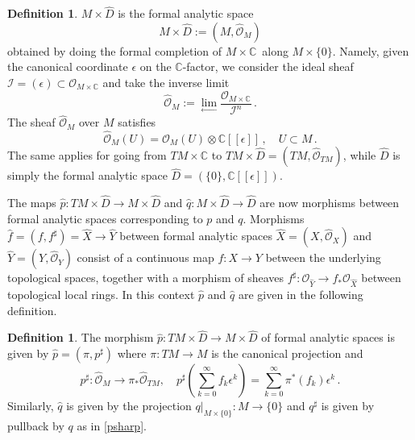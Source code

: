 \documentclass{article}
\theoremstyle{definition}
\newtheorem{definition}[theorem]{Definition}
\numberwithin{equation}{section}
\begin{document}
\begin{definition} $M\times \widehat{D}$ is the formal analytic space \begin{equation*}M\times \widehat{D}:=(M,\widehat{\mathcal{O}}_{M})\end{equation*} obtained by doing the formal completion of $M\times \mathbb{C}$\ along $M\times \{0\}$. Namely, given the canonical coordinate $\epsilon$ on the $\mathbb{C}$-factor, we consider the ideal sheaf $\mathcal{I}=(\epsilon)\subset \mathcal{O}_{M\times \mathbb{C}}$ and take the inverse limit
\begin{equation*}
    \widehat{\mathcal{O}}_M:=\lim_{\longleftarrow}\frac{\mathcal{O}_{M\times \mathbb{C}}}{\mathcal{I}^{n}}\,.
\end{equation*}
The sheaf $\widehat{\mathcal{O}}_{M}$ over $M$ satisfies
\begin{equation*}
    \widehat{\mathcal{O}}_{M}(U)=\mathcal{O}_M(U)\otimes \mathbb{C}[[\epsilon]]\,, \quad U\subset M\,.
\end{equation*}
The same applies for going from $TM\times \mathbb{C}$ to $TM\times \widehat{D}=(TM,\widehat{\mathcal{O}}_{TM})$, while $\widehat{D}$ is simply the formal analytic space $\widehat{D}=(\{0\}, \mathbb{C}[[\epsilon]])$.
\end{definition}

The maps $\widehat{p}:TM\times \widehat{D}\to M\times \widehat{D}$ and $\widehat{q}:M\times \widehat{D}\to \widehat{D}$ are now morphisms between formal analytic spaces corresponding to $p$ and $q$.  Morphisms $\widehat{f}=(f,f^{\sharp})=\widehat{X}\to \widehat{Y}$ between formal analytic spaces $\widehat{X}=(X,\widehat{\mathcal{O}}_{X})$ and $\widehat{Y}=(Y,\widehat{\mathcal{O}}_{Y})$ consist of a continuous map $f:X\to Y$ between the underlying topological spaces, together with a morphism of sheaves $f^{\sharp}:\mathcal{O}_{\widehat{Y}}\to f_*\mathcal{O}_{\widehat{X}}$ between topological local rings. In this context $\widehat{p}$ and $\widehat{q}$ are given in the following definition.

\begin{definition}
    The morphism $\widehat{p}:TM\times \widehat{D}\to M\times \widehat{D}$ of formal analytic spaces is given by $\widehat{p}=(\pi,p^{\sharp})$ where $\pi:TM\to M$ is the canonical projection and 
\begin{equation}\label{psharp}
    p^{\sharp}:\widehat{\mathcal{O}}_{M} \to \pi_*\widehat{\mathcal{O}}_{TM}, \quad p^{\sharp}\left(\sum_{k=0}^{\infty}f_k\epsilon^k\right)=\sum_{k=0}^{\infty}\pi^*(f_k)\epsilon^k\,.
\end{equation}
Similarly, $\widehat{q}$ is given by the projection $q|_{M\times \{0\}}:M\to \{0\}$ and $q^{\sharp}$ is given by pullback by $q$ as in \eqref{psharp}.  
\end{definition}
\end{document}
